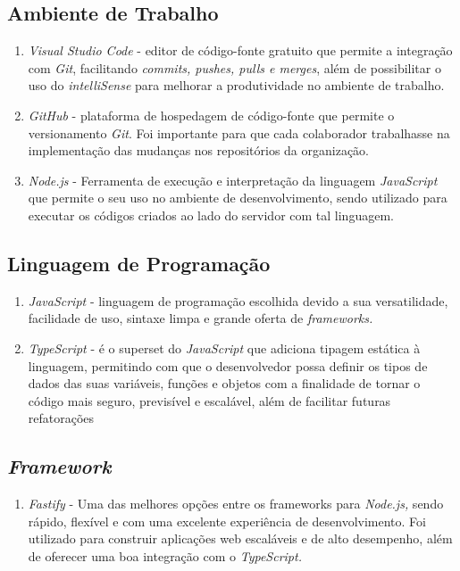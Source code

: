 \subsection{Ambiente de Trabalho}

\begin{enumerate}
	\item\textit{Visual Studio Code} - editor de código-fonte gratuito que permite a integração com \textit{Git}, facilitando \textit{commits, pushes, pulls e merges}, além de possibilitar o uso do \textit{intelliSense} para melhorar a produtividade no ambiente de trabalho.
	
	\item \textit{GitHub} -  plataforma de hospedagem de código-fonte que permite o versionamento \textit{Git}. Foi importante para que cada colaborador trabalhasse na implementação das mudanças nos repositórios da organização.
	
	\item \textit{Node.js} -  Ferramenta de execução e interpretação da linguagem \textit{JavaScript} que permite o seu uso no ambiente de desenvolvimento, sendo utilizado para executar os códigos criados ao lado do servidor com tal linguagem. 
\end{enumerate}


\subsection{Linguagem de Programação}

\begin{enumerate}
	\item \textit{JavaScript} -   linguagem de programação escolhida devido a sua  versatilidade, facilidade de uso, sintaxe limpa e grande oferta de \textit{frameworks.}
	\item \textit{TypeScript} - é o superset do \textit{JavaScript} que adiciona tipagem estática à linguagem,  permitindo com que o desenvolvedor possa definir os tipos de dados das suas variáveis, funções e objetos com a finalidade de tornar o código mais seguro, previsível e escalável, além de facilitar futuras refatorações

\end{enumerate}

\subsection{\textit{Framework}}

\begin{enumerate}
	\item\textit{Fastify} - Uma das melhores opções entre os frameworks para \textit{Node.js,} sendo rápido, flexível e com uma excelente experiência de desenvolvimento. Foi utilizado para construir aplicações web escaláveis e de alto desempenho, além de oferecer uma boa integração com o \textit{TypeScript.} 
\end{enumerate}

